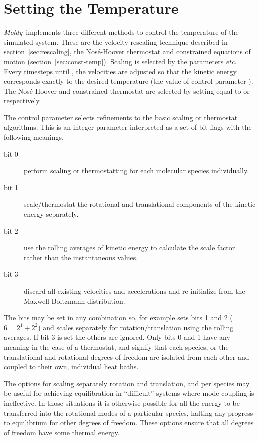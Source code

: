 \documentclass[a4paper,twoside]{report}
\newcommand{\moldy}{\emph{Moldy}}
\newcommand{\etc}{\emph{etc.}}
\begin{document}
\section{Setting the Temperature}%

\moldy\ implements three different methods to control the temperature
of the simulated system. These are the velocity rescaling technique
described in section~\ref{sec:rescaling}, the Nos\'e-Hoover thermostat
and constrained equations of motion (section~\ref{sec:const-temp}).
Scaling is selected by the parameters  \etc\ %
Every  timesteps until , the
velocities are adjusted so that the kinetic energy corresponds exactly
to the desired temperature (the value of control parameter
).  The Nos\'e-Hoover and constrained thermostat
are selected by setting  equal to  or
 respectively.

The control parameter  selects refinements to
the basic scaling or thermostat algorithms. This is an integer
parameter interpreted as a set of bit flags with the following meanings.
\begin{description}
\item[bit 0]    perform scaling or thermostatting for each molecular species individually.
\item[bit 1]    scale/thermostat the rotational and translational components of
the kinetic energy separately.
\item[bit 2]    use the rolling averages of kinetic energy to
calculate the scale factor rather than the instantaneous values.
\item[bit 3]    discard all existing velocities and accelerations and
re-initialize from the Maxwell-Boltzmann distribution.
\end{description}
The bits may be set in any combination so, for example
 sets bits 1 and 2 ($ 6 = 2^1 + 2^2$) and scales
separately for rotation/translation using the rolling averages.  If
bit 3 is set the others are ignored.  Only bits 0 and 1 have any
meaning in the case of a thermostat, and signify that each species, or
the translational and rotational degrees of freedom are isolated from
each other and coupled to their own, individual heat baths.

The options for scaling separately rotation and translation, and per
species may be useful for achieving equilibration in ``difficult''
systems where mode-coupling is ineffective.  In those situations it is
otherwise possible for all the energy to be transferred into the
rotational modes of a particular species, halting any progress to
equilibrium for other degrees of freedom.   These options ensure that
all degrees of freedom have some thermal energy.
\end{document}
